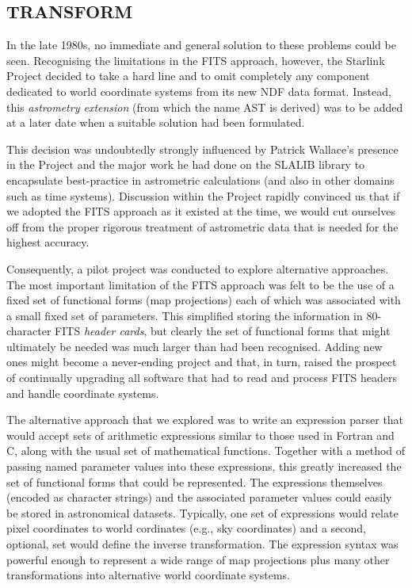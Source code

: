 \documentclass[final,authoryear,5p,times,twocolumn]{elsarticle}
\begin{document}
\subsection{TRANSFORM}

In the late 1980s, no immediate and general solution to these problems
could be seen. Recognising the limitations in the FITS approach,
however, the Starlink Project decided to take a hard line and to omit
completely any component dedicated to world coordinate systems from
its new NDF data format. Instead, this \emph{astrometry extension}
(from which the name AST is derived) was to be added at a later date
when a suitable solution had been formulated.

This decision was undoubtedly strongly influenced by Patrick Wallace's
presence in the Project and the major work he had done on the SLALIB
library \citep[][]{1994ASPC...61..481W} to encapsulate best-practice in
astrometric calculations (and also in other domains such as time
systems). Discussion within the Project rapidly convinced us that if
we adopted the FITS approach as it existed at the time, we would cut
ourselves off from the proper rigorous treatment of astrometric data
that is needed for the highest accuracy.

Consequently, a pilot project was conducted to explore alternative
approaches. The most important limitation of the FITS approach was felt
to be the use of a fixed set of functional forms (map projections) each
of which was associated with a small fixed set of parameters. This
simplified storing the information in 80-character FITS \emph{header cards},
but clearly the set of functional forms that might ultimately be needed
was much larger than had been recognised. Adding new ones might become a
never-ending project and that, in turn, raised the prospect of
continually upgrading all software that had to read and process FITS
headers and handle coordinate systems.

The alternative approach that we explored was to write an expression
parser that would accept sets of arithmetic expressions similar to those
used in Fortran and C, along with the usual set of mathematical
functions. Together with a method of passing named parameter values into
these expressions, this greatly increased the set of functional forms
that could be represented. The expressions themselves (encoded as
character strings) and the associated parameter values could easily be
stored in astronomical datasets. Typically, one set of expressions would
relate pixel coordinates to world cordinates (e.g., sky coordinates) and
a second, optional, set would define the inverse transformation. The
expression syntax was powerful enough to represent a wide range of map
projections plus many other transformations into alternative world
coordinate systems.
\end{document}

